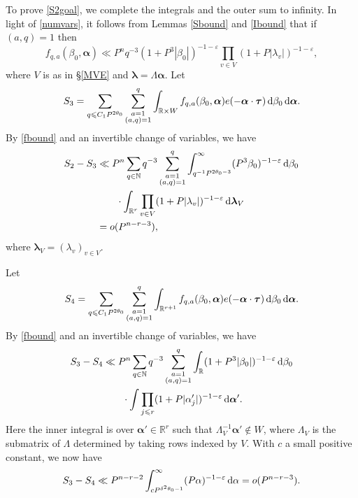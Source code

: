 \documentclass[12pt,reqno]{amsart}
\theoremstyle{definition}
\theoremstyle{remark}
\numberwithin{equation}{section}
\begin{document}
To prove \eqref{S2goal}, we complete the integrals and the outer sum to infinity. In light of \eqref{numvars}, it follows from Lemmas \ref{Sbound} and \ref{Ibound} that if $(a,q) = 1$ then
\begin{equation} \label{fbound}
f_{q,a}({{\beta}}_0,{\boldsymbol{{\alpha}}}) \ll P^n q^{-3} (1 + P^3|{{\beta}}_0|)^{-1-{\varepsilon}} \prod_{v \in V} (1+ P|{{\lambda}}_v|)^{-1-{\varepsilon}},
\end{equation}
where $V$ is as in \S \ref{MVE} and ${{\boldsymbol {{\lambda}}}} = {{\Lambda}} {\boldsymbol{{\alpha}}}$. Let
\[
S_3 = \sum_{q {\leqslant} C_1 P^{2 {{\theta}}_0}} \sum_{\substack{a=1 \\ (a,q)= 1}}^q \displaystyle \int_{{\mathbb R} \times W} 
f_{q,a}({{\beta}}_0,{\boldsymbol{{\alpha}}}) e(-{\boldsymbol{{\alpha}}} \cdot {\boldsymbol{\tau}}) {{\,{\rm d}}} {{\beta}}_0 {{\,{\rm d}}} {\boldsymbol{{\alpha}}}.
\]
By \eqref{fbound} and an invertible change of variables, we have
\begin{align} \notag
S_2 - S_3 & \ll P^n \sum_{q \in {\mathbb N}} q^{-3} \sum_{\substack{a=1 \\ (a,q)= 1}}^q 
\int_{q^{-1} P^{2 {{\theta}}_0 - 3}}^\infty
(P^3 {{\beta}}_0)^{-1-{\varepsilon}} {{\,{\rm d}}} {{\beta}}_0 \\
\notag & \qquad \cdot
\int_{{\mathbb R}^r} \prod_{v \in V} (1+P|{{\lambda}}_v|)^{-1-{\varepsilon}} {{\,{\rm d}}} {{\boldsymbol {{\lambda}}}}_V \\
\label{S2S3} &= o(P^{n-r-3}),
\end{align}
where ${{\boldsymbol {{\lambda}}}}_V = ({{\lambda}}_v)_{v \in V}$.

Let
\[
S_4 = \sum_{q {\leqslant} C_1 P^{2 {{\theta}}_0}} \sum_{\substack{a=1 \\ (a,q)= 1}}^q \displaystyle \int_{{\mathbb R}^{r+1}} 
f_{q,a}({{\beta}}_0,{\boldsymbol{{\alpha}}}) e(-{\boldsymbol{{\alpha}}} \cdot {\boldsymbol{\tau}}) {{\,{\rm d}}} {{\beta}}_0 {{\,{\rm d}}} {\boldsymbol{{\alpha}}}.
\]
By \eqref{fbound} and an invertible change of variables, we have
\begin{align*} 
S_3 - S_4 & \ll P^n \sum_{q \in {\mathbb N}} q^{-3} \sum_{\substack{a=1 \\ (a,q)= 1}}^q 
\int_{\mathbb R}
(1 + P^3 |{{\beta}}_0|)^{-1-{\varepsilon}} {{\,{\rm d}}} {{\beta}}_0 \\
& \qquad \cdot
\int \prod_{j {\leqslant} r} (1+P|{{\alpha}}'_j|)^{-1-{\varepsilon}} {{\,{\rm d}}} {\boldsymbol{{\alpha}}}'.
\end{align*}
Here the inner integral is over ${\boldsymbol{{\alpha}}}' \in {\mathbb R}^r$ such that $ {{\Lambda}}_V^{-1} {\boldsymbol{{\alpha}}}'\notin W$, where ${{\Lambda}}_V$ is the submatrix of ${{\Lambda}}$ determined by taking rows indexed by $V$. With $c$ a small positive constant, we now have
\begin{equation} \label{S3S4}
S_3 - S_4 \ll P^{n-r-2} \int_{cP^{{{\delta}}^2 {{\theta}}_0 - 1}}^\infty (P {{\alpha}})^{-1-{\varepsilon}} {{\,{\rm d}}} {{\alpha}} = o(P^{n-r-3}).
\end{equation}
\end{document}
